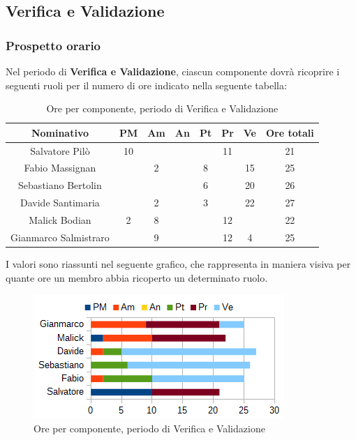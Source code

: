 	\subsection{Verifica e Validazione}
		\subsubsection{Prospetto orario}
		Nel periodo di \textbf{Verifica e Validazione}, ciascun componente dovrà ricoprire i seguenti ruoli per il numero di ore indicato nella seguente tabella: \\
		\begin{table}[H]
		\centering
		\begin{tabular}{|c|c|c|c|c|c|c|c|}
			\hline
			\textbf{Nominativo}		& \textbf{PM}	& \textbf{Am}	& \textbf{An}	& \textbf{Pt}	& \textbf{Pr}	& \textbf{Ve}	& \textbf{Ore totali}     \\
			\hline
			Salvatore Pilò			& 10	& 		& 		&		& 11	&		& 21 \\
			Fabio Massignan			&		& 2		&		& 8		&		& 15	& 25 \\
			Sebastiano Bertolin		&		& 		& 		& 6		&		& 20	& 26 \\
			Davide Santimaria		&		& 2		& 		& 3		&		& 22	& 27 \\
			Malick Bodian			& 2		& 8		&		&		& 12	& 		& 22 \\
			Gianmarco Salmistraro	&		& 9		& 		&		& 12	& 4		& 25 \\
			\hline
		\end{tabular}
		\caption{Ore per componente, periodo di Verifica e Validazione}
		\end{table}
		I valori sono riassunti nel seguente grafico, che rappresenta in maniera visiva per quante ore un membro abbia ricoperto un determinato ruolo. \\
		\begin{figure}[H]
			\centering
			\includegraphics[scale=1]{immagini/grafici/validazione-barra.png}
			\caption{Ore per componente, periodo di Verifica e Validazione}
		\end{figure}
